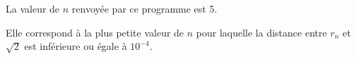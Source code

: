 \begin{enumerate}
\begin{enumerate}
%

La valeur de $n$ renvoyée par ce programme est 5.


Elle correspond à  la plus petite valeur de $n$ pour laquelle la distance entre $r_n$ et $\sqrt{2}$ est inférieure ou égale à  $10^{-4}$.

	\end{enumerate}
\end{enumerate}

\bigskip

